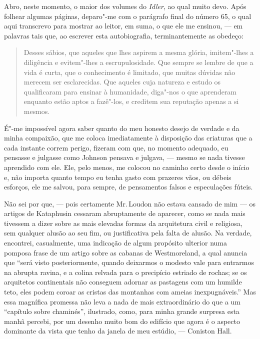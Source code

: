 Abro, neste momento, o maior dos volumes do \textit{Idler}, ao qual muito
devo. Após folhear algumas páginas, deparo"-me com o parágrafo final do
número 65, o qual aqui transcrevo para mostrar ao leitor, em suma, o que ele
me ensinou, --- em palavras tais que, ao escrever esta autobiografia,
terminantemente as obedeço: %

\begin{quote}
Desses sábios, que aqueles que lhes aspirem a mesma glória,
imitem"-lhes a diligência e evitem"-lhes a escrupulosidade. Que sempre se
lembre de que a vida é curta, que o conhecimento é limitado, que muitas
dúvidas não merecem ser esclarecidas. Que aqueles cuja natureza e estudo
os qualificaram para ensinar à humanidade, diga"-nos o que aprenderam
enquanto estão aptos a fazê"-los, e creditem sua reputação apenas a si
mesmos.
\end{quote}

É"-me impossível agora saber quanto do meu honesto desejo de verdade e da
minha compaixão, que me coloca imediatamente à disposição das criaturas
que a cada instante correm perigo, fizeram com que, no momento adequado,
eu pensasse e julgasse como Johnson pensava e julgava, --- mesmo se nada
tivesse aprendido com ele. Ele, pelo menos, me colocou no caminho certo
desde o início e, não importa quanto tempo eu tenha gasto com prazeres
vãos, ou débeis esforços, ele me salvou, para sempre, de pensamentos
falsos e especulações fúteis.

Não sei por que, --- pois certamente Mr.\,Loudon não estava cansado de
mim --- os artigos de Kataphusin cessaram abruptamente de aparecer, como
se nada mais tivessem a dizer sobre as mais elevadas formas da
arquitetura civil e religiosa, sem qualquer alusão ao seu fim, ou
justificativa pela falta de alusão. Na verdade, encontrei, casualmente,
uma indicação de algum propósito ulterior numa pomposa frase de um
artigo sobre as cabanas de Westmoreland, a qual anuncia que ``será visto
posteriormente, quando deixarmos o modesto vale para entrarmos na
abrupta ravina, e a colina relvada para o precipício estriado de rochas;
se os arquitetos continentais não conseguem adornar as pastagens com um
humilde teto, eles podem coroar as cristas das montanhas com ameias
inexpugnáveis.'' Mas essa magnífica promessa não leva a nada de mais
extraordinário do que a um ``capítulo sobre chaminés'', ilustrado, como,
para minha grande surpresa esta manhã percebi, por um desenho muito bom
do edifício que agora é o aspecto dominante da vista que tenho da janela
de meu estúdio, --- Coniston Hall.

